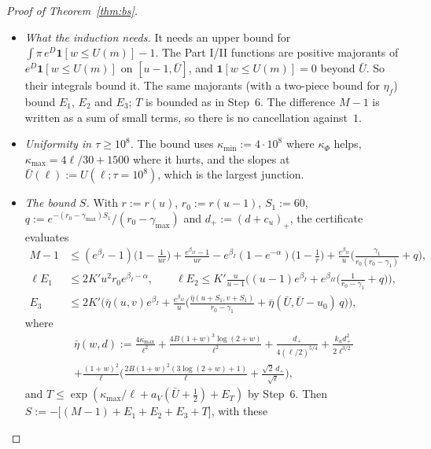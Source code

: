 \begin{proof}[Proof of Theorem~\ref{thm:bs}]
\begin{itemize}
  $\gamma_{\max}=(B/\ell)\,8(1+\bar U)^2\log(2+\bar U)+k_u(\bar U-u_0+c_u)_+/\sqrt\ell$. This is
  combined with $\rho(w-1)/\rho(u-1)\le e^{-r(u-1)s}$ \ref{R3}. The integrals converge because $r(u-1)>\gamma_1$ and
  $r(u-1)>\gamma_{\max}$, which is checked in every cell.
\item \emph{What the induction needs.} It needs an upper bound for $\int\pi\,e^D\mathbf 1[w\le U(m)]-1$. The Part I/II
  functions are positive majorants of $e^D\mathbf 1[w\le U(m)]$ on $[u-1,\bar U]$, and $\mathbf 1[w\le U(m)]=0$ beyond
  $\bar U$. So their integrals bound it. The same majorants (with a two-piece bound for $\eta_f$) bound $E_1$, $E_2$ and
  $E_3$; $T$ is bounded as in Step~6. The difference $M-1$ is written as a sum of small terms, so there is no cancellation
  against~$1$.
\item \emph{Uniformity in $\tau\ge10^8$.} The bound uses $\kappa_{\min}:=4\cdot10^8$ where $\kappa_\Phi$ helps,
  $\kappa_{\max}=4\ell/30+1500$ where it hurts, and the slopes at $\bar U(\ell):=U(\ell;\tau=10^8)$, which is the largest
  junction.
\item \emph{The bound $S$.} With $r:=r(u)$, $r_0:=r(u-1)$, $S_1:=60$, $q:=e^{-(r_0-\gamma_{\max})S_1}/(r_0-\gamma_{\max})$ and
  $d_+:=(d+c_u)_+$, the certificate evaluates
  \begin{align*}
    M-1&\le(e^{\beta_I}-1)\Big(1-\frac1{ur}\Big)+\frac{e^{\beta_{II}}-1}{ur}-e^{\beta_I}(1-e^{-\alpha})\Big(1-\frac1r\Big)
      +\frac{e^{\beta_{II}}}u\Big(\frac{\gamma_1}{r_0(r_0-\gamma_1)}+q\Big),\\
    \ell E_1&\le2K'u^2r_0e^{\beta_I-\alpha},\qquad
    \ell E_2\le K'\frac u{u-1}\Big((u-1)e^{\beta_I}+e^{\beta_{II}}\Big(\frac1{r_0-\gamma_1}+q\Big)\Big),\\
    E_3&\le2K'\Big(\bar\eta(u,v)e^{\beta_I}+\frac{e^{\beta_{II}}}u\Big(\frac{\bar\eta(u+S_1,v+S_1)}{r_0-\gamma_1}
      +\bar\eta(\bar U,\bar U-u_0)\,q\Big)\Big),
  \end{align*}
  where
  \begin{multline*}
    \bar\eta(w,d):=\frac{4\kappa_{\max}}{\ell^2}+\frac{4B(1+w)^3\log(2+w)}{\ell^2}+\frac{d_+}{4(\ell/2)^{5/4}}
      +\frac{k_ud_+^2}{2\ell^{3/2}}\\
      +\frac{(1+w)^2}\ell\Big(\frac{2B(1+w)^2(3\log(2+w)+1)}\ell+\frac{\sqrt2\,d_+}{\sqrt\ell}\Big),
  \end{multline*}
  and $T\le\exp(\kappa_{\max}/\ell+a_V(\bar U+\frac12)+E_T)$ by Step~6. Then $S:=-\big[(M-1)+E_1+E_2+E_3+T\big]$, with these

\end{itemize}
\end{proof}
